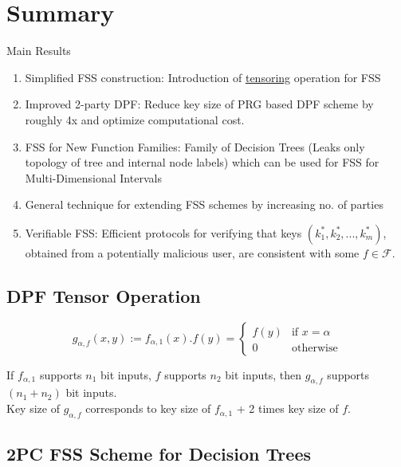 
\clearpage
{}

%
\setcounter{section}{0} %

\section{Summary}
Main Results
\begin{enumerate}
    \item Simplified FSS construction: Introduction of \underline{tensoring} operation for FSS 
    \item Improved 2-party DPF: Reduce key size of PRG based DPF scheme by roughly 4x and optimize computational cost.
    \item FSS for New Function Families: Family of Decision Trees (Leaks only topology of tree and internal node labels) which can be used for FSS for Multi-Dimensional Intervals
    \item General technique for extending FSS schemes by increasing no. of parties
    \item Verifiable FSS: Efficient protocols for verifying that keys $(k_1^*, k_2^*, ..., k_m^*)$, obtained from a potentially malicious user, are consistent with some $f \in \mathcal{F}$.
\end{enumerate}

\subsection{DPF Tensor Operation}

\[
g_{\alpha, f}(x, y) := f_{\alpha, 1}(x).f(y) =
\begin{cases} 
f(y) & \text{if } x = \alpha \\
0 & \text{otherwise}
\end{cases}
\]

If $f_{\alpha, 1}$ supports $n_1$ bit inputs, $f$ supports $n_2$ bit inputs, then $g_{\alpha, f}$ supports $(n_1 + n_2)$ bit inputs. \\
Key size of $g_{\alpha, f}$ corresponds to key size of $f_{\alpha, 1}$ + 2 times key size of $f$.

\subsection{2PC FSS Scheme for Decision Trees}
%
